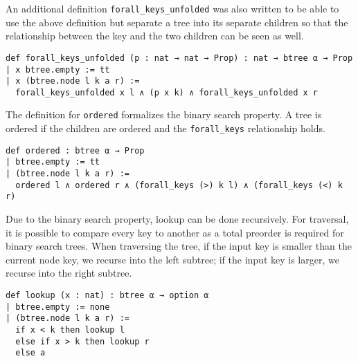 An additional definition \lstinline{forall_keys_unfolded} was also written to be able to use the above definition but separate a tree into its separate children so that the relationship between the key and the two children can be seen as well. 

\begin{lstlisting}
def forall_keys_unfolded (p : nat → nat → Prop) : nat → btree α → Prop
| x btree.empty := tt
| x (btree.node l k a r) :=
  forall_keys_unfolded x l ∧ (p x k) ∧ forall_keys_unfolded x r
\end{lstlisting}

The definition for \lstinline{ordered} formalizes the binary search property. A tree is ordered if the children are ordered and the \lstinline{forall_keys} relationship holds.

\begin{lstlisting}
def ordered : btree α → Prop
| btree.empty := tt
| (btree.node l k a r) :=
  ordered l ∧ ordered r ∧ (forall_keys (>) k l) ∧ (forall_keys (<) k r)
\end{lstlisting}

Due to the binary search property, lookup can be done recursively. For traversal, it is possible to compare every key to another as a total preorder is required for binary search trees. When traversing the tree, if the input key is smaller than the current node key, we recurse into the left subtree; if the input key is larger, we recurse into the right subtree.  

\begin{lstlisting}
def lookup (x : nat) : btree α → option α
| btree.empty := none
| (btree.node l k a r) :=
  if x < k then lookup l
  else if x > k then lookup r
  else a
\end{lstlisting}